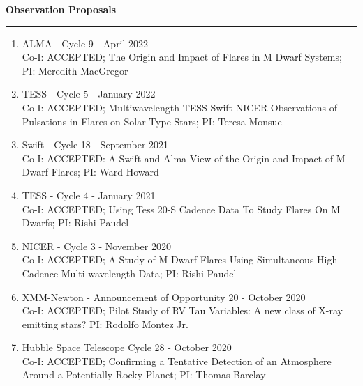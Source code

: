 \documentclass[letter,11pt]{article}
\begin{document}
\noindent
{\bf Observation Proposals} \\
\vspace{-10mm}
\begin{center}
\rule{\textwidth}{0.2mm}
\end{center}
\vspace{-3mm}
\noindent
\begin{enumerate}[\bfseries 1.] 

\item ALMA - Cycle 9 - April 2022 \\
Co-I: ACCEPTED; The Origin and Impact of Flares in M Dwarf Systems; PI: Meredith MacGregor

\item TESS - Cycle 5 - January 2022 \\
Co-I: ACCEPTED; Multiwavelength TESS-Swift-NICER Observations of Pulsations in Flares on Solar-Type Stars; PI: Teresa Monsue

\item Swift - Cycle 18 - September 2021 \\
Co-I: ACCEPTED: A Swift and Alma View of the Origin and Impact of M-Dwarf Flares; PI: Ward Howard

\item TESS - Cycle 4 - January 2021 \\
Co-I: ACCEPTED; Using Tess 20-S Cadence Data To Study Flares On M Dwarfs; PI: Rishi Paudel

\item NICER - Cycle 3 - November 2020 \\
Co-I: ACCEPTED; A Study of M Dwarf Flares Using Simultaneous High Cadence Multi-wavelength Data; PI: Rishi Paudel

\item XMM-Newton - Announcement of Opportunity 20 - October 2020 \\
Co-I: ACCEPTED; Pilot Study of RV Tau Variables: A new class of X-ray emitting stars? PI: Rodolfo Montez Jr.


\item Hubble Space Telescope Cycle 28 - October 2020 \\
Co-I: ACCEPTED; Confirming a Tentative Detection of an Atmosphere Around a Potentially Rocky Planet; PI: Thomas Barclay


\end{enumerate}
\end{document}

